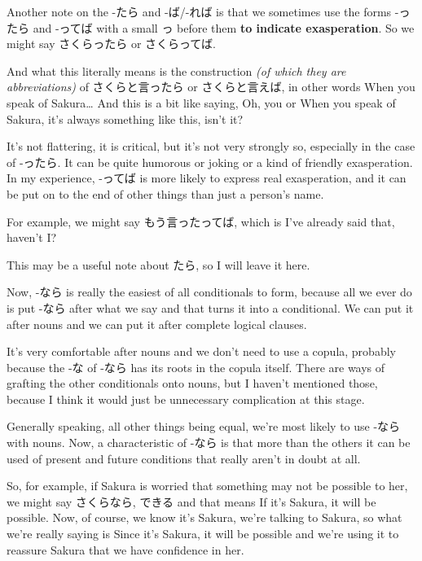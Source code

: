 Another note on the -たら and -ば/-れば is that we sometimes use the forms -ったら and -ってば with a small っ before them {\bf to indicate exasperation}. So we might say さくらったら or さくらってば.

And what this literally means is the construction {\em (of which they are abbreviations)} of さくらと言ったら or さくらと言えば, in other words When you speak of Sakura\ldots{} And this is a bit like saying, Oh, you or When you speak of Sakura, it's always something like this, isn't it?

It's not flattering, it is critical, but it's not very strongly so, especially in the case of -ったら. It can be quite humorous or joking or a kind of friendly exasperation. In my experience, -ってば is more likely to express real exasperation, and it can be put on to the end of other things than just a person's name.

For example, we might say もう言ったってば, which is I've already said that, haven't I?

This may be a useful note about たら, so I will leave it here.

{}

\stopsectionlevel

\startsectionlevel[title={なら Conditional},reference={なら-conditional}]

Now, -なら is really the easiest of all conditionals to form, because all we ever do is put -なら after what we say and that turns it into a conditional. We can put it after nouns and we can put it after complete logical clauses.

It's very comfortable after nouns and we don't need to use a copula, probably because the -な of -なら has its roots in the copula itself. There are ways of grafting the other conditionals onto nouns, but I haven't mentioned those, because I think it would just be unnecessary complication at this stage.

Generally speaking, all other things being equal, we're most likely to use -なら with nouns. Now, a characteristic of -なら is that more than the others it can be used of present and future conditions that really aren't in doubt at all.

So, for example, if Sakura is worried that something may not be possible to her, we might say さくらなら, できる and that means If it's Sakura, it will be possible. Now, of course, we know it's Sakura, we're talking to Sakura, so what we're really saying is Since it's Sakura, it will be possible and we're using it to reassure Sakura that we have confidence in her.

